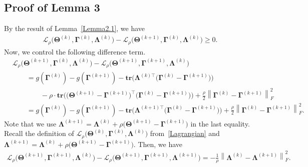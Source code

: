 \documentclass[alpha-refs]{wiley-article}
\begin{document}
\subsection{Proof of Lemma 3}
By the result of Lemma~\ref{Lemma2.1}, we have
\begin{align} \label{ineq1}
    \mathcal{L}_{\rho} \big( \boldsymbol{\Theta}^{(k)},\boldsymbol{\Gamma}^{(k)},\boldsymbol{\Lambda}^{(k)} \big) 
    - \mathcal{L}_{\rho} \big( \boldsymbol{\Theta}^{(k+1)},\boldsymbol{\Gamma}^{(k)},\boldsymbol{\Lambda}^{(k)} \big)
    \geq 0.
\end{align}
Now, we control the following difference term.
\begin{align} \label{ineq2}
    &\mathcal{L}_{\rho} \big( \boldsymbol{\Theta}^{(k+1)},\boldsymbol{\Gamma}^{(k)},\boldsymbol{\Lambda}^{(k)} \big) - \mathcal{L}_{\rho} \big( \boldsymbol{\Theta}^{(k+1)},\boldsymbol{\Gamma}^{(k+1)},\boldsymbol{\Lambda}^{(k)} \big) \nonumber \\
    &\qquad = g(\boldsymbol{\Gamma}^{(k)})-g(\boldsymbol{\Gamma}^{(k+1)}) - \textbf{tr}\big( \boldsymbol{\Lambda}^{(k)\top}\big(\boldsymbol{\Gamma}^{(k)}-\boldsymbol{\Gamma}^{(k+1)}\big)\big) \nonumber \\
    &\qquad \qquad - \rho \cdot \textbf{tr}\big( \big(\boldsymbol{\Theta}^{(k+1)}-\boldsymbol{\Gamma}^{(k+1)}\big)^{\top}
    \big(\boldsymbol{\Gamma}^{(k)}-\boldsymbol{\Gamma}^{(k+1)}\big) \big) + \frac{\rho}{2}\left\| \boldsymbol{\Gamma}^{(k)}-\boldsymbol{\Gamma}^{(k+1)} \right\|_{F}^{2}  \nonumber \\
    &\qquad = g(\boldsymbol{\Gamma}^{(k)})-g(\boldsymbol{\Gamma}^{(k+1)}) - \textbf{tr}\big( \boldsymbol{\Lambda}^{(k+1)\top}\big(\boldsymbol{\Gamma}^{(k)}-\boldsymbol{\Gamma}^{(k+1)}\big)\big) + \frac{\rho}{2}\left\| \boldsymbol{\Gamma}^{(k)}-\boldsymbol{\Gamma}^{(k+1)} \right\|_{F}^{2}.
\end{align}
Note that we use $\boldsymbol{\Lambda}^{(k+1)}=\boldsymbol{\Lambda}^{(k)}+\rho\big(\boldsymbol{\Theta}^{(k+1)}-\boldsymbol{\Gamma}^{(k+1)}\big)$ in the last equality.
Recall the definition of $\mathcal{L}_{\rho} \big( \boldsymbol{\Theta}^{(k)},\boldsymbol{\Gamma}^{(k)},\boldsymbol{\Lambda}^{(k)} \big)$ from~\eqref{Lagrangian} and $\boldsymbol{\Lambda}^{(k+1)}=\boldsymbol{\Lambda}^{(k)}+\rho\big(\boldsymbol{\Theta}^{(k+1)}-\boldsymbol{\Gamma}^{(k+1)}\big)$.
Then, we have
\begin{align} \label{ineq3}
    \mathcal{L}_{\rho} \big( \boldsymbol{\Theta}^{(k+1)},\boldsymbol{\Gamma}^{(k+1)},\boldsymbol{\Lambda}^{(k)} \big) 
    - \mathcal{L}_{\rho} \big( \boldsymbol{\Theta}^{(k+1)},\boldsymbol{\Gamma}^{(k+1)},\boldsymbol{\Lambda}^{(k+1)} \big) 
    = -\frac{1}{\rho}\left\| \boldsymbol{\Lambda}^{(k)}-\boldsymbol{\Lambda}^{(k+1)} \right\|_{F}^{2}.
\end{align}
\end{document}
